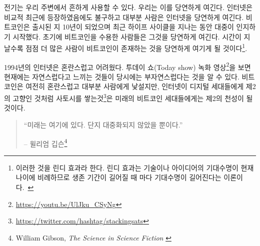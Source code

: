 \begin{comment}
	Electricity has been around for a while now. We take it for granted. The
	internet is quite a bit younger, but most people already take it for
	granted as well. Bitcoin is ten years old and has entered public
	consciousness during the last hype cycle. Only the earliest of adopters
	take it for granted. As more time passes, more and more people will
	recognize Bitcoin as something which simply is.\footnote{This is known as the
		\textit{Lindy Effect}. The Lindy effect is a theory that the future life expectancy
		of some non-perishable things like a technology or an idea is proportional to
		their current age, so that every additional period of survival implies a longer
		remaining life expectancy.~\cite{wiki:lindy}}
\end{comment}
전기는 우리 주변에서 흔하게 사용할 수 있다. 우리는 이를 당연하게 여긴다.
인터넷은 비교적 최근에 등장하였음에도 불구하고 대부분 사람은 인터넷을 당연하게 여긴다.
비트코인은 출시된 지 10년이 되었으며 최근 하이프 사이클을 지나는 동안 대중이 인지하기 시작했다.
초기에 비트코인을 수용한 사람들은 그것을 당연하게 여긴다. 
시간이 지날수록 점점 더 많은 사람이 비트코인이 존재하는 것을 당연하게 여기게 될 것이다\footnote{이러한 것을
	린디 효과라 한다. 린디 효과는 기술이나 아이디어의 기대수명이 현재 나이에 비례하므로 
	생존 기간이 길어질 때 마다 기대수명이 길어진다는 이론이다.~\cite{wiki:lindy}}.

\begin{comment}
	In 1994, the internet was still confusing and unintuitive. Watching this old
	recording of the \textit{Today
		Show}\footnote{\url{https://youtu.be/UlJku_CSyNg}} makes it obvious that what
	feels natural and intuitive now actually wasn't back then. Bitcoin is still
	confusing and alien to most, but just like the internet is second nature for
	digital natives, spending and stacking
	sats\footnote{\url{https://twitter.com/hashtag/stackingsats}} will be second
	nature to the bitcoin natives of the future.
\end{comment}
1994년의 인터넷은 혼란스럽고 어려웠다. 
투데이 쇼(Today show) 녹화 영상\footnote{\url{https://youtu.be/UlJku_CSyNg}}을 
보면 현재에는 자연스럽다고 느끼는 것들이 당시에는 부자연스럽다는 것을 알 수 있다.
비트코인은 여전히 혼란스럽고 대부분 사람에게 낯설지만, 
인터넷이 디지털 세대들에게 제2의 고향인 것처럼 사토시를 쌓는것\footnote{\url{https://twitter.com/hashtag/stackingsats}}은 미래의 비트코인 세대들에게는 제2의 천성이 될 것이다.

\begin{quotation}\begin{samepage}
		\enquote{미래는 여기에 있다. 단지 대중화되지 않았을 뿐이다.}
		\begin{flushright} -- 윌리엄 깁슨\footnote{William Gibson, \textit{The Science in Science Fiction} \cite{william-gibson}}
\end{flushright}\end{samepage}\end{quotation}


